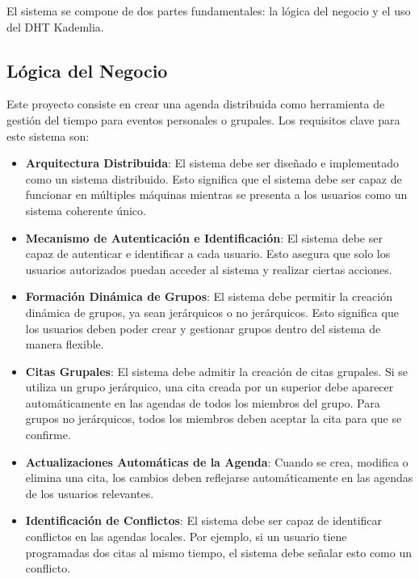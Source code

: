\documentclass[10pt]{article} %
\begin{document}
	El sistema se compone de dos partes fundamentales: la lógica del negocio y el uso del DHT Kademlia.
	
	\subsection{Lógica del Negocio}
	
	Este proyecto consiste en crear una agenda distribuida como herramienta de gestión del tiempo para eventos personales o grupales. Los requisitos clave para este sistema son:
	
	\begin{itemize}
		\item \textbf{Arquitectura Distribuida}: El sistema debe ser diseñado e implementado como un sistema distribuido. Esto significa que el sistema debe ser capaz de funcionar en múltiples máquinas mientras se presenta a los usuarios como un sistema coherente único.
		
		\item \textbf{Mecanismo de Autenticación e Identificación}: El sistema debe ser capaz de autenticar e identificar a cada usuario. Esto asegura que solo los usuarios autorizados puedan acceder al sistema y realizar ciertas acciones.
		
		\item \textbf{Formación Dinámica de Grupos}: El sistema debe permitir la creación dinámica de grupos, ya sean jerárquicos o no jerárquicos. Esto significa que los usuarios deben poder crear y gestionar grupos dentro del sistema de manera flexible.
		
		\item \textbf{Citas Grupales}: El sistema debe admitir la creación de citas grupales. Si se utiliza un grupo jerárquico, una cita creada por un superior debe aparecer automáticamente en las agendas de todos los miembros del grupo. Para grupos no jerárquicos, todos los miembros deben aceptar la cita para que se confirme.
		
		\item \textbf{Actualizaciones Automáticas de la Agenda}: Cuando se crea, modifica o elimina una cita, los cambios deben reflejarse automáticamente en las agendas de los usuarios relevantes.
		
		\item \textbf{Identificación de Conflictos}: El sistema debe ser capaz de identificar conflictos en las agendas locales. Por ejemplo, si un usuario tiene programadas dos citas al mismo tiempo, el sistema debe señalar esto como un conflicto.
	\end{itemize}
	
\end{document}
